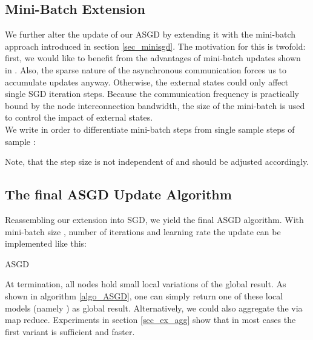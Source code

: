 \documentclass{acm_proc_article-sp}
\begin{document}
\subsection{Mini-Batch Extension}
We further alter the update of our ASGD by extending it with the mini-batch 
approach introduced
in section \ref{sec_minisgd}. The motivation for this is twofold: first, we would 
like to benefit from the advantages of mini-batch updates shown in 
\cite{sculley2010web}. Also, the sparse nature of the asynchronous communication 
forces us to accumulate updates anyway. Otherwise, the external states could only
affect single SGD iteration steps. Because the communication frequency is 
practically bound by the node interconnection bandwidth, the size of the 
mini-batch  is used to control the impact of external states.\\    
We write  in order to differentiate mini-batch steps
from single sample steps  of sample :   

Note, that the step size  is not independent of  and should be 
adjusted accordingly.\\ 

\subsection{The final ASGD Update Algorithm\label{sec_final}}
Reassembling our extension into SGD, we yield the final ASGD algorithm.
With mini-batch size , number of iterations  
and learning rate  the update can be implemented like this:
\begin{algorithm}
\caption{ASGD }
\label{algo_ASGD}
\begin{algorithmic}[1]
\Require{}
\ForAll{ }
\EndFor
\EndFor
\State{\Return  }
\end{algorithmic}

\end{algorithm}
At termination, all nodes  hold small local 
variations of the global
result. As shown in algorithm \ref{algo_ASGD}, one can simply return 
one of these local models (namely ) as global result. 
Alternatively, we could also aggregate the  via map reduce.
Experiments in section \ref{sec_ex_agg} show that in most cases the first variant is 
sufficient and faster. 
\end{document}
